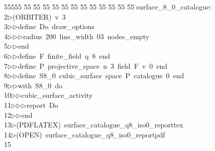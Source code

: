 %
%
\begin{tabbing}
55555 \= 55 \= 55 \= 55 \= 55 \= 55 \= 55 \= 55 \= 55 \= 55 \= 55 \= 55 \= 55 \= \>surface\_8\_0\_catalogue:\\[0pt]
2\>$\triangleright$\>(ORBITER)\ v\ 3\ \\[0pt]
3\>$\triangleright$\>$\triangleright$\>define\ Do\ draw\_options\ \\[0pt]
4\>$\triangleright$\>$\triangleright$\>$\triangleright$\>radius\ 200\ line\_width\ 03\ nodes\_empty\ \\[0pt]
5\>$\triangleright$\>$\triangleright$\>end\ \\[0pt]
6\>$\triangleright$\>$\triangleright$\>define\ F\ finite\_field\ q\ 8\ end\ \\[0pt]
7\>$\triangleright$\>$\triangleright$\>define\ P\ projective\_space\ n\ 3\ field\ F\ v\ 0\ end\ \\[0pt]
8\>$\triangleright$\>$\triangleright$\>define\ S8\_0\ cubic\_surface\ space\ P\ catalogue\ 0\ end\ \\[0pt]
9\>$\triangleright$\>$\triangleright$\>with\ S8\_0\ do\ \\[0pt]
10\>$\triangleright$\>$\triangleright$\>cubic\_surface\_activity\ \\[0pt]
11\>$\triangleright$\>$\triangleright$\>$\triangleright$\>report\ Do\ \\[0pt]
12\>$\triangleright$\>$\triangleright$\>end\\[0pt]
13\>$\triangleright$\>(PDFLATEX)\ surface\_catalogue\_q8\_iso0\_reporttex\\[0pt]
14\>$\triangleright$\>(OPEN)\ surface\_catalogue\_q8\_iso0\_reportpdf\\[0pt]
15\>\end{tabbing}
